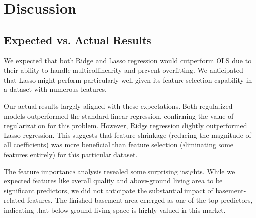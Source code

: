 \documentclass{article}
\begin{document}
\section{Discussion}

\subsection{Expected vs. Actual Results}

We expected that both Ridge and Lasso regression would outperform OLS due to their ability to handle multicollinearity and prevent overfitting. We anticipated that Lasso might perform particularly well given its feature selection capability in a dataset with numerous features.

Our actual results largely aligned with these expectations. Both regularized models outperformed the standard linear regression, confirming the value of regularization for this problem. However, Ridge regression slightly outperformed Lasso regression. This suggests that feature shrinkage (reducing the magnitude of all coefficients) was more beneficial than feature selection (eliminating some features entirely) for this particular dataset.

The feature importance analysis revealed some surprising insights. While we expected features like overall quality and above-ground living area to be significant predictors, we did not anticipate the substantial impact of basement-related features. The finished basement area emerged as one of the top predictors, indicating that below-ground living space is highly valued in this market.


\end{document}
